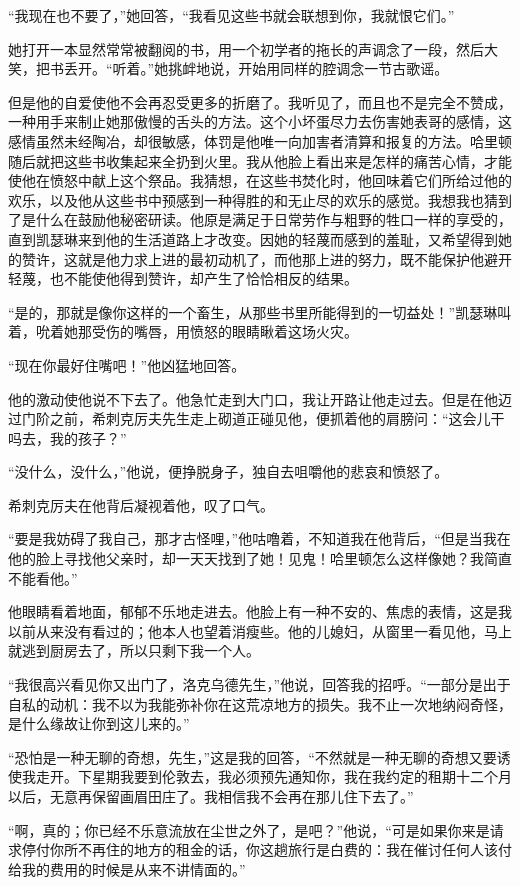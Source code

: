 \par “我现在也不要了，”她回答，“我看见这些书就会联想到你，我就恨它们。”
\par 她打开一本显然常常被翻阅的书，用一个初学者的拖长的声调念了一段，然后大笑，把书丢开。“听着。”她挑衅地说，开始用同样的腔调念一节古歌谣。
\par 但是他的自爱使他不会再忍受更多的折磨了。我听见了，而且也不是完全不赞成，一种用手来制止她那傲慢的舌头的方法。这个小坏蛋尽力去伤害她表哥的感情，这感情虽然未经陶冶，却很敏感，体罚是他唯一向加害者清算和报复的方法。哈里顿随后就把这些书收集起来全扔到火里。我从他脸上看出来是怎样的痛苦心情，才能使他在愤怒中献上这个祭品。我猜想，在这些书焚化时，他回味着它们所给过他的欢乐，以及他从这些书中预感到一种得胜的和无止尽的欢乐的感觉。我想我也猜到了是什么在鼓励他秘密研读。他原是满足于日常劳作与粗野的牲口一样的享受的，直到凯瑟琳来到他的生活道路上才改变。因她的轻蔑而感到的羞耻，又希望得到她的赞许，这就是他力求上进的最初动机了，而他那上进的努力，既不能保护他避开轻蔑，也不能使他得到赞许，却产生了恰恰相反的结果。
\par “是的，那就是像你这样的一个畜生，从那些书里所能得到的一切益处！”凯瑟琳叫着，吮着她那受伤的嘴唇，用愤怒的眼睛瞅着这场火灾。
\par “现在你最好住嘴吧！”他凶猛地回答。
\par 他的激动使他说不下去了。他急忙走到大门口，我让开路让他走过去。但是在他迈过门阶之前，希刺克厉夫先生走上砌道正碰见他，便抓着他的肩膀问：“这会儿干吗去，我的孩子？”
\par “没什么，没什么，”他说，便挣脱身子，独自去咀嚼他的悲哀和愤怒了。
\par 希刺克厉夫在他背后凝视着他，叹了口气。
\par “要是我妨碍了我自己，那才古怪哩，”他咕噜着，不知道我在他背后，“但是当我在他的脸上寻找他父亲时，却一天天找到了她！见鬼！哈里顿怎么这样像她？我简直不能看他。”
\par 他眼睛看着地面，郁郁不乐地走进去。他脸上有一种不安的、焦虑的表情，这是我以前从来没有看过的；他本人也望着消瘦些。他的儿媳妇，从窗里一看见他，马上就逃到厨房去了，所以只剩下我一个人。
\par “我很高兴看见你又出门了，洛克乌德先生，”他说，回答我的招呼。“一部分是出于自私的动机：我不以为我能弥补你在这荒凉地方的损失。我不止一次地纳闷奇怪，是什么缘故让你到这儿来的。”
\par “恐怕是一种无聊的奇想，先生，”这是我的回答，“不然就是一种无聊的奇想又要诱使我走开。下星期我要到伦敦去，我必须预先通知你，我在我约定的租期十二个月以后，无意再保留画眉田庄了。我相信我不会再在那儿住下去了。”
\par “啊，真的；你已经不乐意流放在尘世之外了，是吧？”他说，“可是如果你来是请求停付你所不再住的地方的租金的话，你这趟旅行是白费的：我在催讨任何人该付给我的费用的时候是从来不讲情面的。”
